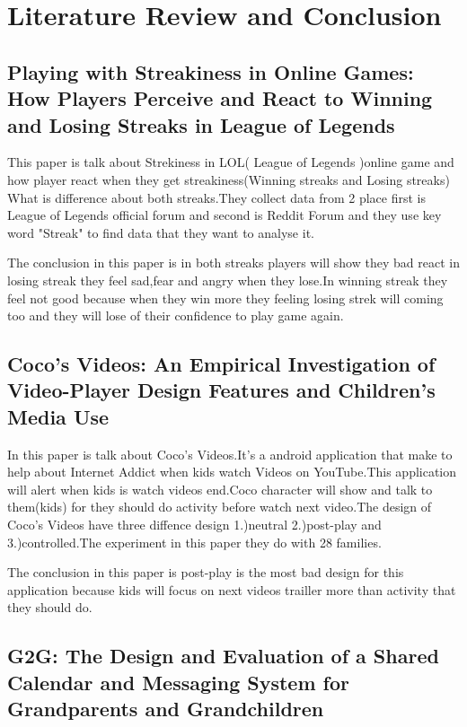 \section{Literature Review and Conclusion}

\subsection{Playing with Streakiness in Online Games: How Players
Perceive and React to Winning and Losing Streaks in
League of Legends }

This paper is talk about Strekiness in LOL( League of Legends )online game and how player react when they get streakiness(Winning streaks and Losing streaks)
What is difference about both streaks.They collect data from 2 place first is League of Legends official forum and second is Reddit Forum and
they use key word "Streak" to find data that they want to analyse it.

The conclusion in this  paper is in both streaks players will show they bad react in losing streak they feel sad,fear and angry when they lose.In winning streak they feel not good because when they win more they feeling 
losing strek will coming too and they will lose of their confidence to play game again.

\subsection{Coco’s Videos: An Empirical Investigation of Video-Player
Design Features and Children's Media Use }

In this paper is talk about Coco's Videos.It's a android application that make to help about Internet Addict when kids watch Videos on YouTube.This application will alert when kids is watch videos end.Coco character will show and talk to them(kids) for they should do activity
before watch next video.The design of Coco's Videos have three diffence design 1.)neutral 2.)post-play and 3.)controlled.The experiment in this paper they do with 28 families. 

The conclusion in this paper is post-play is the most bad design for this application because kids will focus on next videos trailler more than activity that they should do. 


\subsection{G2G: The Design and Evaluation of a Shared Calendar and
Messaging System for Grandparents and Grandchildren }


